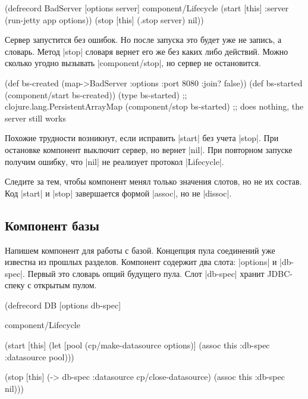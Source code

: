 \begin{english}
  \begin{clojure}
(defrecord BadServer [options server]
  component/Lifecycle
  (start [this]
    {:server (run-jetty app options)})
  (stop [this]
    (.stop server)
    nil))
  \end{clojure}
\end{english}

Сервер запустится без ошибок. Но после запуска это будет уже не запись, а
словарь. Метод \spverb|stop| словаря вернет его же без каких либо
действий. Можно сколько угодно вызывать \spverb|component/stop|, но сервер не
остановится.

\begin{english}
  \begin{clojure}
(def bs-created (map->BadServer {:options {:port 8080 :join? false}}))
(def bs-started (component/start bs-created))
(type bs-started)
;; clojure.lang.PersistentArrayMap
(component/stop bs-started)
;; does nothing, the server still works
  \end{clojure}
\end{english}

Похожие трудности возникнут, если исправить \spverb|start| без учета
\spverb|stop|. При остановке компонент выключит сервер, но вернет
\spverb|nil|. При повторном запуске получим ошибку, что \spverb|nil| не
реализует протокол \spverb|Lifecycle|.

Следите за тем, чтобы компонент менял только значения слотов, но не их
состав. Код \spverb|start| и \spverb|stop| завершается формой \spverb|assoc|, но
не \spverb|dissoc|.

\subsection{Компонент базы}

Напишем компонент для работы с базой. Концепция пула соединений уже известна из
прошлых разделов. Компонент содержит два слота: \spverb|options| и
\spverb|db-spec|. Первый это словарь опций будущего пула. Слот \spverb|db-spec|
хранит JDBC-спеку с открытым пулом.

\begin{english}
  \begin{clojure}
(defrecord DB
    [options db-spec]

  component/Lifecycle

  (start [this]
    (let [pool (cp/make-datasource options)]
      (assoc this :db-spec {:datasource pool})))

  (stop [this]
    (-> db-spec :datasource cp/close-datasource)
    (assoc this :db-spec nil)))
  \end{clojure}
\end{english}

